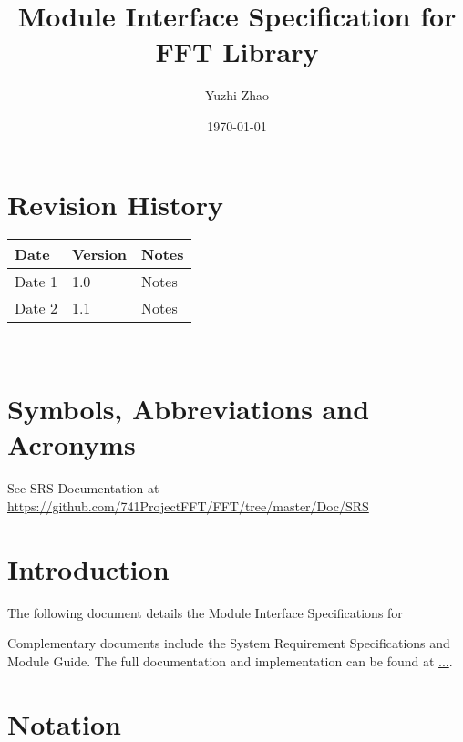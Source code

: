 \documentclass[12pt, titlepage]{article}
\begin{document}
\title{Module Interface Specification for FFT Library}

\author{Yuzhi Zhao}

\date{\today}

\maketitle


\section{Revision History}

\begin{tabularx}{\textwidth}{p{3cm}p{2cm}X}
\toprule {\bf Date} & {\bf Version} & {\bf Notes}\\
\midrule
Date 1 & 1.0 & Notes\\
Date 2 & 1.1 & Notes\\
\bottomrule
\end{tabularx}

~\newpage

\section{Symbols, Abbreviations and Acronyms}

See SRS Documentation at \url {https://github.com/741ProjectFFT/FFT/tree/master/Doc/SRS}


\newpage

\tableofcontents

\newpage


\section{Introduction}

The following document details the Module Interface Specifications for

Complementary documents include the System Requirement Specifications
and Module Guide.  The full documentation and implementation can be
found at \url{...}.  

\section{Notation}
\end{document}
